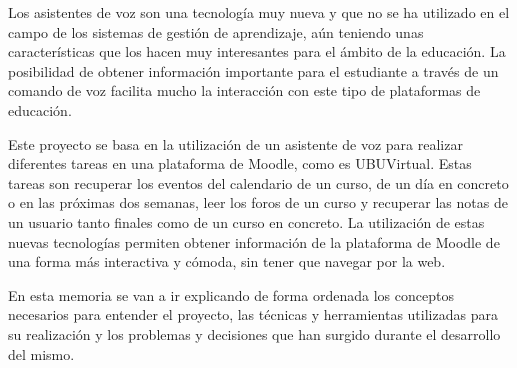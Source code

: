 
Los asistentes de voz son una tecnología muy nueva y que no se ha utilizado en el campo de los sistemas de gestión de aprendizaje, aún teniendo unas características que los hacen muy interesantes para el ámbito de la educación. La posibilidad de obtener información importante para el estudiante a través de un comando de voz facilita mucho la interacción con este tipo de plataformas de educación.

Este proyecto se basa en la utilización de un asistente de voz para realizar diferentes tareas en una plataforma de Moodle, como es  UBUVirtual. Estas tareas son recuperar los eventos del calendario de un curso, de un día en concreto o en las próximas dos semanas, leer los foros de un curso y recuperar las notas de un usuario tanto finales como de un curso en concreto. La utilización de estas nuevas tecnologías permiten obtener información de la plataforma de Moodle de una forma más interactiva y cómoda, sin tener que navegar por la web.

En esta memoria se van a ir explicando de forma ordenada los conceptos necesarios para entender el proyecto, las técnicas y herramientas utilizadas para su realización y los problemas y decisiones que han surgido durante el desarrollo del mismo.